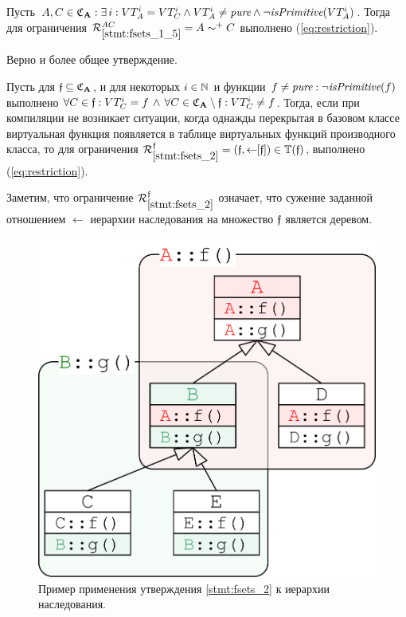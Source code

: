 \begin{statement}\label{stmt:fsets_1_5}
Пусть $A, C \in \mathfrak{C}_{\mathbf{A}}: \exists \, i: VT_A^i = VT_C^i \wedge VT_A^i \ne \textit{pure} \wedge \neg \textit{isPrimitive}(VT_A^i)$. Тогда для ограничения $\mathcal{R}_{\ref{stmt:fsets_1_5}}^{AC} = A \sim^+ C$ выполнено (\ref{eq:restriction}).
\end{statement}

Верно и более общее утверждение.

\begin{statement}\label{stmt:fsets_2}
Пусть для $\mathfrak{f} \subseteq \mathfrak{C}_{\mathbf{A}}$, и для некоторых $i \in \mathbb{N}$ и функции $f \ne \textit{pure}: \neg \textit{isPrimitive}(f)$ выполнено $\forall C \in \mathfrak{f}: VT_C^i = f \, \wedge \, \forall C \in \mathfrak{C}_{\mathbf{A}} \setminus \mathfrak{f}: VT_C^i \ne f$. Тогда, если при компиляции не возникает ситуации, когда однажды перекрытая в базовом классе виртуальная функция появляется в таблице виртуальных функций производного класса, то для ограничения $\mathcal{R}_{\ref{stmt:fsets_2}}^{\mathfrak{f}} = (\mathfrak{f}, \leftarrow \!\! [\mathfrak{f}]) \in \mathbb{T}(\mathfrak{f})$, выполнено (\ref{eq:restriction}).
\end{statement}

Заметим, что ограничение $\mathcal{R}_{\ref{stmt:fsets_2}}^{\mathfrak{f}}$ означает, что сужение заданной отношением $\leftarrow$ иерархии наследования на множество $\mathfrak{f}$ является деревом.

\begin{figure}[htb!]
\centering
\includegraphics[scale=1.0]{images/fset.png}
\caption{Пример применения утверждения \ref{stmt:fsets_2} к иерархии наследования.}
\label{fig:fsets}
\end{figure}

